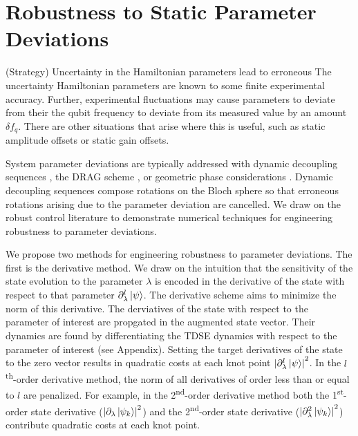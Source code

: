 \documentclass[
  amsfonts,
  amsmath,
  tbtags,
  amssymb,
  aps,
  nobibnotes,
  twocolumn,
  superscriptaddress,
]{revtex4-2}
\begin{document}
\section{Robustness to Static Parameter Deviations}
(Strategy) Uncertainty in the Hamiltonian parameters lead
to erroneous 
The uncertainty Hamiltonian parameters are known to
some finite experimental accuracy. Further,
experimental fluctuations may cause parameters to deviate
from their
the qubit frequency to deviate from its measured value
by an amount $\delta f_{q}$. There are other situations that
arise where this is useful, such as static amplitude
offsets or static gain offsets.

System parameter
deviations are typically addressed with dynamic decoupling
sequences \cite{merrill2014progress},
the DRAG scheme \cite{krantz2019quantum}, or
geometric phase considerations
\cite{xu2020nonadiabatic} \cite{han2020experimental}.
Dynamic decoupling sequences compose rotations on the
Bloch sphere so that erroneous rotations arising due
to the parameter deviation are cancelled.
We draw on the
robust control literature to demonstrate
numerical techniques for engineering robustness
to parameter deviations.

We propose two methods for engineering robustness
to parameter deviations. The first is the
derivative method. We draw on the intuition that
the sensitivity of the state evolution to the parameter
$\lambda$ is encoded in the derivative of
the state with respect to that parameter
$\partial_{\lambda}^{l} \ket{\psi}$. The derivative
scheme aims to minimize the norm of this derivative.
The derviatives of the state with respect to the parameter
of interest are propgated in the
augmented state vector. Their dynamics are found by differentiating
the TDSE dynamics with respect to the parameter of interest
(see Appendix). Setting the target derivatives of the state
to the zero vector results in quadratic costs at each
knot point
${\lvert \partial_{\lambda}^{l} \ket{\psi} \rvert}^{2}$.
In the $l$\textsuperscript{th}-order derivative method, the norm of
all derivatives of order less than or equal to $l$ are penalized. For example,
in the 2\textsuperscript{nd}-order derivative method both the
1\textsuperscript{st}-order state derivative
(${\lvert \partial_{\lambda} \ket{\psi_{k}} \rvert}^{2}$)
and the 2\textsuperscript{nd}-order state derivative
(${\lvert \partial^{2}_{\lambda} \ket{\psi_{k}} \rvert}^{2}$)
contribute quadratic costs at each knot point.
\end{document}
